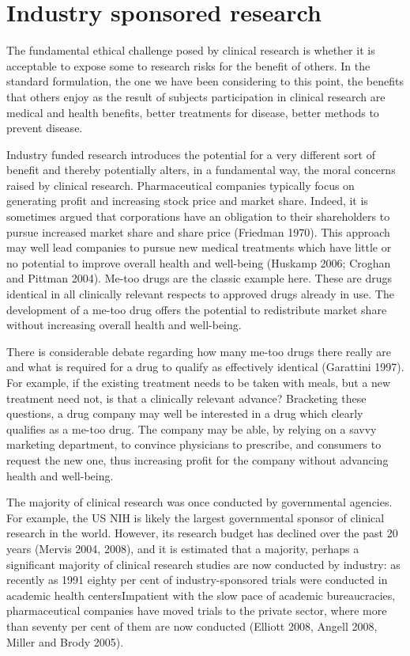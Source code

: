 \documentclass[12p]{article}
\begin{document}
\section{Industry sponsored research}

 The fundamental ethical challenge posed by clinical research is whether it is acceptable to expose some to research risks for the benefit of others. In the standard formulation, the one we have been considering to this point, the benefits that others enjoy as the result of subjects participation in clinical research are medical and health benefits, better treatments for disease, better methods to prevent disease.

Industry funded research introduces the potential for a very different sort of benefit and thereby potentially alters, in a fundamental way, the moral concerns raised by clinical research. Pharmaceutical companies typically focus on generating profit and increasing stock price and market share. Indeed, it is sometimes argued that corporations have an obligation to their shareholders to pursue increased market share and share price (Friedman 1970). This approach may well lead companies to pursue new medical treatments which have little or no potential to improve overall health and well-being (Huskamp 2006; Croghan and Pittman 2004). Me-too drugs are the classic example here. These are drugs identical in all clinically relevant respects to approved drugs already in use. The development of a me-too drug offers the potential to redistribute market share without increasing overall health and well-being.

There is considerable debate regarding how many me-too drugs there really are and what is required for a drug to qualify as effectively identical (Garattini 1997). For example, if the existing treatment needs to be taken with meals, but a new treatment need not, is that a clinically relevant advance? Bracketing these questions, a drug company may well be interested in a drug which clearly qualifies as a me-too drug. The company may be able, by relying on a savvy marketing department, to convince physicians to prescribe, and consumers to request the new one, thus increasing profit for the company without advancing health and well-being.

The majority of clinical research was once conducted by governmental agencies. For example, the US NIH is likely the largest governmental sponsor of clinical research in the world. However, its research budget has declined over the past 20 years (Mervis 2004, 2008), and it is estimated that a majority, perhaps a significant majority of clinical research studies are now conducted by industry: as recently as 1991 eighty per cent of industry-sponsored trials were conducted in academic health centersImpatient with the slow pace of academic bureaucracies, pharmaceutical companies have moved trials to the private sector, where more than seventy per cent of them are now conducted (Elliott 2008, Angell 2008, Miller and Brody 2005).
\end{document}
